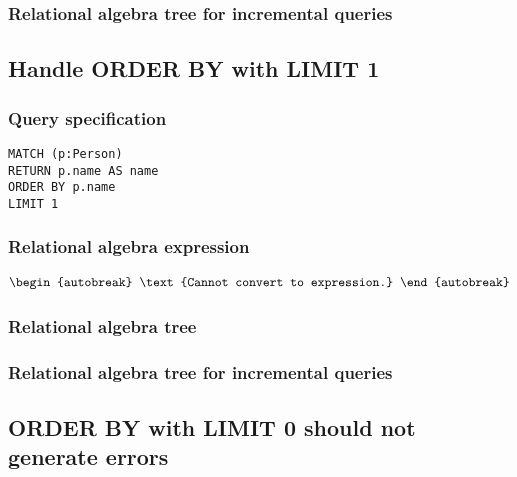 \subsubsection*{Relational algebra tree for incremental queries}


\subsection{Handle ORDER BY with LIMIT 1}

\subsubsection*{Query specification}

\begin{lstlisting}
MATCH (p:Person)
RETURN p.name AS name
ORDER BY p.name
LIMIT 1
\end{lstlisting}

\subsubsection*{Relational algebra expression}

\begin{align*}
\begin{autobreak}
\text{Cannot convert to expression.}
\end{autobreak}
\end{align*}

\subsubsection*{Relational algebra tree}


\subsubsection*{Relational algebra tree for incremental queries}


\subsection{ORDER BY with LIMIT 0 should not generate errors}

